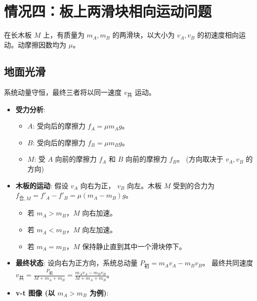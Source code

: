 \documentclass[a4paper,11pt]{ctexart}
\begin{document}
\section{情况四：板上两滑块相向运动问题}
在长木板 $M$ 上，有质量为 $m_A, m_B$ 的两滑块，以大小为 $v_A, v_B$ 的初速度相向运动。动摩擦因数均为 $\mu$。

\subsection{地面光滑}
系统动量守恒，最终三者将以同一速度 $v_{共}$ 运动。
\begin{itemize}
    \item \textbf{受力分析}:
        \begin{itemize}
            \item $A$: 受向后的摩擦力 $f_A = \mu m_A g$。
            \item $B$: 受向后的摩擦力 $f_B = \mu m_B g$。
            \item $M$: 受 $A$ 向前的摩擦力 $f_A$ 和 $B$ 向前的摩擦力 $f_B$。 (方向取决于 $v_A, v_B$ 的方向)
        \end{itemize}
    \item \textbf{木板的运动}:
        假设 $v_A$ 向右为正， $v_B$ 向左。木板 $M$ 受到的合力为 $f_{合,M} = f'_{A} - f'_{B} = \mu(m_A - m_B)g$。
        \begin{itemize}
            \item 若 $m_A > m_B$，$M$ 向右加速。
            \item 若 $m_A < m_B$，$M$ 向左加速。
            \item 若 $m_A = m_B$，$M$ 保持静止直到其中一个滑块停下。
        \end{itemize}
    \item \textbf{最终状态}:
        设向右为正方向，系统总动量 $P_{初} = m_A v_A - m_B v_B$。
        最终共同速度 $v_{共} = \frac{P_{初}}{M+m_A+m_B} = \frac{m_A v_A - m_B v_B}{M+m_A+m_B}$。
    \item \textbf{v-t 图像 (以 $m_A > m_B$ 为例)}:
    \begin{center}
    \end{center}
\end{itemize}
\end{document}
